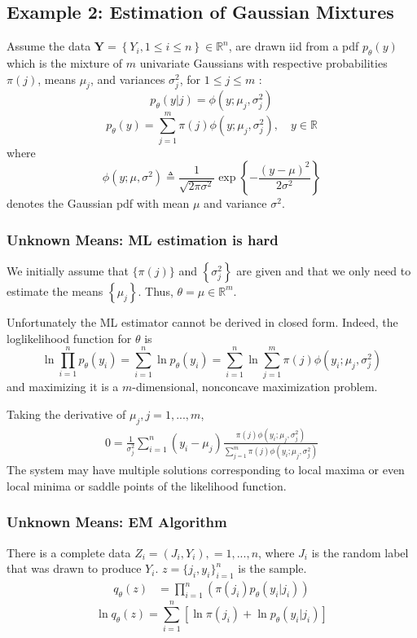 \documentclass[11pt,a4paper]{article}
\begin{document}
\subsection{Example 2: Estimation of Gaussian Mixtures}
Assume the data $\boldsymbol{Y}=\left\{Y_i, 1 \leq i \leq n\right\} \in \mathbb{R}^n$, are drawn iid from a pdf $p_\theta(y)$ which is the mixture of $m$ univariate Gaussians with respective probabilities $\pi(j)$, means $\mu_j$, and variances $\sigma_j^2$, for $1 \leq j \leq m$ :
$$p_\theta(y|j)=\phi\left(y ; \mu_j, \sigma_j^2\right)$$
$$
p_\theta(y)=\sum_{j=1}^m \pi(j) \phi\left(y ; \mu_j, \sigma_j^2\right), \quad y \in \mathbb{R}
$$
where
$$\phi\left(y ; \mu, \sigma^2\right) \triangleq \frac{1}{\sqrt{2 \pi \sigma^2}} \exp \left\{-\frac{(y-\mu)^2}{2 \sigma^2}\right\}$$
denotes the Gaussian pdf with mean $\mu$ and variance $\sigma^2$.
\subsubsection{Unknown Means: ML estimation is hard}
We initially assume that $\{\pi(j)\}$ and $\left\{\sigma_j^2\right\}$ are given and that we only need to estimate the means $\left\{\mu_j\right\}$. Thus, $\theta=\mu \in \mathbb{R}^m$.

Unfortunately the ML estimator cannot be derived in closed form. Indeed, the loglikelihood function for $\theta$ is
$$
\ln \prod_{i=1}^n p_\theta(y_i)=\sum_{i=1}^n \ln p_\theta\left(y_i\right)=\sum_{i=1}^n \ln \sum_{j=1}^m \pi(j) \phi\left(y_i ; \mu_j, \sigma_j^2\right)
$$
and maximizing it is a $m$-dimensional, nonconcave maximization problem.

Taking the derivative of $\mu_j, j=1,...,m$,
\begin{equation}
    \begin{aligned}
        0=\frac{1}{\sigma^2_j}\sum_{i=1}^n(y_i-\mu_j)\frac{\pi(j)\phi(y_i ; \mu_j, \sigma_j^2)}{\sum_{j=1}^m\pi(j)\phi(y_i ; \mu_j, \sigma_j^2)}
    \end{aligned}
    \nonumber
\end{equation}
The system may have multiple solutions corresponding to local maxima or even local minima or saddle points of the likelihood function.

\subsubsection{Unknown Means: EM Algorithm}

There is a complete data $Z_i=(J_i,Y_i),=1,...,n$, where $J_i$ is the random label that was drawn to produce $Y_i$. $z=\{j_i,y_i\}_{i=1}^n$ is the sample.
\begin{equation}
    \begin{aligned}
        q_\theta(z)&=\prod_{i=1}^n\left(\pi(j_i)p_\theta(y_i|j_i)\right)
    \end{aligned}
    \nonumber
\end{equation}
$$\ln q_{\theta}(z)=\sum_{i=1}^n[\ln \pi(j_i)+\ln p_{\theta}(y_i|j_i)]$$
\end{document}
